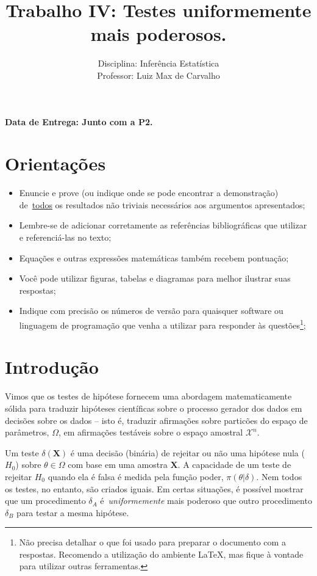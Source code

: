 \documentclass[a4paper,10pt, notitlepage]{report}
\title{Trabalho IV: Testes uniformemente mais poderosos.}
\author{Disciplina: Inferência Estatística \\ Professor: Luiz Max de Carvalho}
\newcommand{\bX}{\boldsymbol{X}} %
\begin{document}
\maketitle

\textbf{Data de Entrega: Junto com a P2.}

\section*{Orientações}
\begin{itemize}
 \item Enuncie e prove (ou indique onde se pode encontrar a demonstração) de~\underline{todos} os resultados não triviais necessários aos argumentos apresentados;
 \item Lembre-se de adicionar corretamente as referências bibliográficas que utilizar e referenciá-las no texto;
 \item Equações e outras expressões matemáticas também recebem pontuação;
 \item Você pode utilizar figuras, tabelas e diagramas para melhor ilustrar suas respostas;
 \item Indique com precisão os números de versão para quaisquer software ou linguagem de programação que venha a utilizar para responder às questões\footnote{Não precisa detalhar o que foi usado para preparar o documento com a respostas. Recomendo a utilização do ambiente LaTeX, mas fique à vontade para utilizar outras ferramentas.};
 \end{itemize}


\section*{Introdução}

Vimos que os testes de hipótese fornecem uma abordagem matematicamente sólida para traduzir hipóteses científicas sobre o processo gerador dos dados em decisões sobre os dados -- isto é, traduzir afirmações sobre particões do espaço de parâmetros, $\Omega$, em afirmações testáveis sobre o espaço amostral $\mathcal{X}^n$.

Um teste $\delta(\bX)$ é uma decisão (binária) de rejeitar ou não uma hipótese nula ($H_0$) sobre $\theta \in \Omega$ com base em uma amostra $\bX$.
A capacidade de um teste de rejeitar $H_0$ quando ela é falsa é medida pela função poder, $\pi(\theta |\delta)$.
Nem todos os testes, no entanto, são criados iguais.
Em certas situações, é possível mostrar que um procedimento $\delta_A$ é~\textit{uniformemente} mais poderoso que outro procedimento $\delta_B$ para testar a mesma hipótese.
\end{document}
